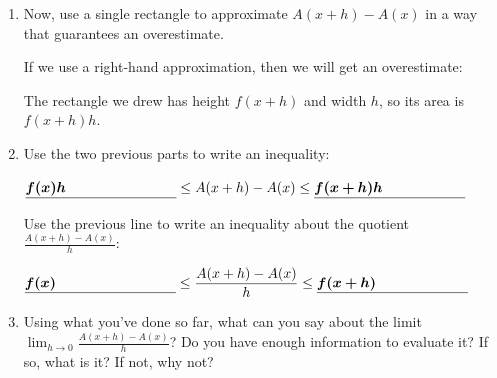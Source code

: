 \documentclass[main]{subfiles}
\begin{document}
\begin{enumerate}[resume]
{\begin{enumerate}[resume]
    \item
      \begin{problem}[\vfill]
        Now, use a single rectangle to approximate $A(x + h) - A(x)$ in a
        way that guarantees an overestimate.
      \end{problem}

      \begin{solution}
        If we use a right-hand approximation, then we will get an
        overestimate:
        \begin{center}
        \end{center}
        The rectangle we drew has height $f(x + h)$ and width $h$, so its
        area is $f(x + h) h$.
      \end{solution}
      

    \item
      Use the two previous parts to write an inequality:
      \begin{center}
        $\fitb{1.5in}{f(x) h} \leq A(x + h) - A(x) \leq 
        \fitb{1.5in}{f(x + h) h}$
      \end{center}
      Use the previous line to write an inequality about the quotient
      $\displaystyle \frac{A(x + h) - A(x)}{h}$:
      \begin{center}
        $\displaystyle \fitb{1.5in}{f(x)} \leq \frac{A(x + h) -
          A(x)}{h} \leq \fitb{1.5in}{f(x + h)}$
      \end{center}

    \item
      \begin{problem}[\vfill]
        Using what you've done so far, what can you say about the limit
        $\displaystyle \lim_{h \to 0} \frac{A(x + h) - A(x)}{h}$?
        Do you have enough information to evaluate it?  If so, what is it?  If
        not, why not?
      \end{problem}


\end{enumerate}}
\end{enumerate}
\end{document}
